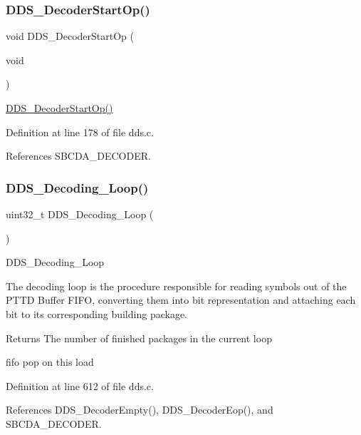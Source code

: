\subsubsection{\texorpdfstring{D\+D\+S\+\_\+\+Decoder\+Start\+Op()}{DDS\_DecoderStartOp()}}
{\footnotesize\ttfamily void D\+D\+S\+\_\+\+Decoder\+Start\+Op (\begin{DoxyParamCaption}\item[{void}]{ }\end{DoxyParamCaption})}

\hyperlink{group___d_d_s___a_p_i_gae4f18ac70ccacf5b0c08f35df3a68c7e}{D\+D\+S\+\_\+\+Decoder\+Start\+Op()} 

Definition at line 178 of file dds.\+c.



References S\+B\+C\+D\+A\+\_\+\+D\+E\+C\+O\+D\+ER.

\mbox{\label{group___d_d_s___a_p_i_ga0d11598fca2a9f0eceb43f06a0fb2c4e}} 
\subsubsection{\texorpdfstring{D\+D\+S\+\_\+\+Decoding\+\_\+\+Loop()}{DDS\_Decoding\_Loop()}}
{\footnotesize\ttfamily uint32\+\_\+t D\+D\+S\+\_\+\+Decoding\+\_\+\+Loop (\begin{DoxyParamCaption}{ }\end{DoxyParamCaption})}

D\+D\+S\+\_\+\+Decoding\+\_\+\+Loop

The decoding loop is the procedure responsible for reading symbols out of the P\+T\+TD Buffer F\+I\+FO, converting them into bit representation and attaching each bit to its corresponding building package.

\begin{DoxyReturn}{Returns}
The number of finished packages in the current loop 
\end{DoxyReturn}
fifo pop on this load 

Definition at line 612 of file dds.\+c.



References D\+D\+S\+\_\+\+Decoder\+Empty(), D\+D\+S\+\_\+\+Decoder\+Eop(), and S\+B\+C\+D\+A\+\_\+\+D\+E\+C\+O\+D\+ER.


